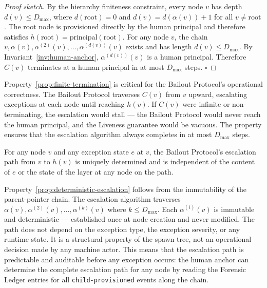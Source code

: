 \begin{proof}[Proof sketch]
By the hierarchy finiteness constraint, every node $v$ has depth $d(v) \leq D_{\max}$,
where $d(\text{root}) = 0$ and $d(v) = d(\alpha(v)) + 1$ for all $v \neq \text{root}$.
The root node is provisioned directly by the human principal and therefore satisfies
$h(\text{root}) = \text{principal}(\text{root})$.  For any node $v$, the chain
$v, \alpha(v), \alpha^{(2)}(v), \ldots, \alpha^{(d(v))}(v)$ exists and has length
$d(v) \leq D_{\max}$.  By Invariant~\ref{inv:human-anchor}, $\alpha^{(d(v))}(v)$
is a human principal.  Therefore $C(v)$ terminates at a human principal in at most
$D_{\max}$ steps.  $\square$
\end{proof}

Property~\ref{prop:finite-termination} is critical for the Bailout Protocol's
operational correctness.  The Bailout Protocol traverses $C(v)$ from $v$ upward,
escalating exceptions at each node until reaching $h(v)$.  If $C(v)$ were infinite
or non-terminating, the escalation would stall — the Bailout Protocol would never
reach the human principal, and the Liveness guarantee would be vacuous.  The
property ensures that the escalation algorithm always completes in at most
$D_{\max}$ steps.

\begin{property}
\label{prop:deterministic-escalation}
For any node $v$ and any exception state $e$ at $v$, the Bailout Protocol's
escalation path from $v$ to $h(v)$ is uniquely determined and is independent of
the content of $e$ or the state of the \bounds{} layer at any node on the path.
\end{property}

Property~\ref{prop:deterministic-escalation} follows from the immutability of
the parent-pointer chain.  The escalation algorithm traverses
$\alpha(v), \alpha^{(2)}(v), \ldots, \alpha^{(k)}(v)$ where $k \leq D_{\max}$.
Each $\alpha^{(i)}(v)$ is immutable and deterministic — established once at node
creation and never modified.  The path does not depend on the exception type, the
exception severity, or any runtime state.  It is a structural property of the
spawn tree, not an operational decision made by any machine actor.  This means
that the escalation path is predictable and auditable before any exception occurs:
the human anchor can determine the complete escalation path for any node by
reading the Forensic Ledger entries for all \texttt{child-provisioned} events
along the chain.

